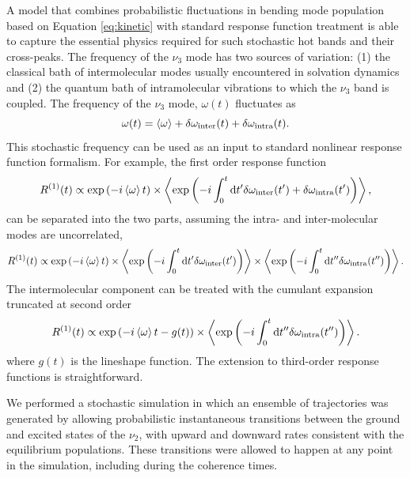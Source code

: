 {A model that combines probabilistic fluctuations in bending mode population based on Equation \ref{eq:kinetic} with standard response function treatment is able to capture the essential physics required for such stochastic hot bands and their cross-peaks. The frequency of the \(\nu_3\) mode has two sources of variation: (1) the classical bath of intermolecular modes usually encountered in solvation dynamics and (2) the quantum bath of intramolecular vibrations to which the \(\nu_3\) band is coupled. The frequency of the \(\nu_3\) mode, $\omega(t)$ fluctuates as
\begin{equation}
  \label{eq:stochastic_frequency}
  \omega(t) = \braket{\omega} + \delta\omega_\mathrm{inter}(t) + \delta\omega_\mathrm{intra}(t).
\end{equation}
This stochastic frequency can be used as an input to standard nonlinear response function formalism. For example, the first order response function
\begin{equation}
  \label{eq:R1_1}
  R^{(1)}(t) \propto \exp{\left( -i\braket{\omega} t \right)} \times \Braket{ \exp{\left(-i\int_0^t \mathrm{d}t' \delta\omega_\mathrm{inter}(t') + \delta\omega_\mathrm{intra}(t')\right)} },
\end{equation}
can be separated into the two parts, assuming the intra- and inter-molecular modes are uncorrelated,
\begin{equation}\label{eq:R1_2}
  R^{(1)}(t) \propto \exp{\left( -i \braket{\omega} t \right)} \times \Braket{ \exp{\left( -i\int_0^t \mathrm{d}t' \delta\omega_\mathrm{inter}(t') \right)} } \times \Braket{  \exp{\left( -i\int_0^t \mathrm{d}t''\delta\omega_\mathrm{intra}(t'') \right)} }.
\end{equation}
The intermolecular component can be treated with the cumulant expansion truncated at second order
\begin{equation}
  \label{eq:R1_2b}
  R^{(1)}(t) \propto \exp{\left( -i \Braket{\omega} {t} - g(t) \right) } \times \Braket{ \exp{ \left( -i\int_0^t \mathrm{d}t''\delta\omega_\mathrm{intra}(t'') \right)} }.
\end{equation}
where \(g(t)\) is the lineshape function. The extension to third-order response functions is straightforward.

We performed a stochastic simulation in which an ensemble of trajectories was generated by allowing probabilistic instantaneous transitions between the ground and excited states of the \(\nu_2\), with upward and downward rates consistent with the equilibrium populations. These transitions were allowed to happen at any point in the simulation, including during the coherence times.

}
